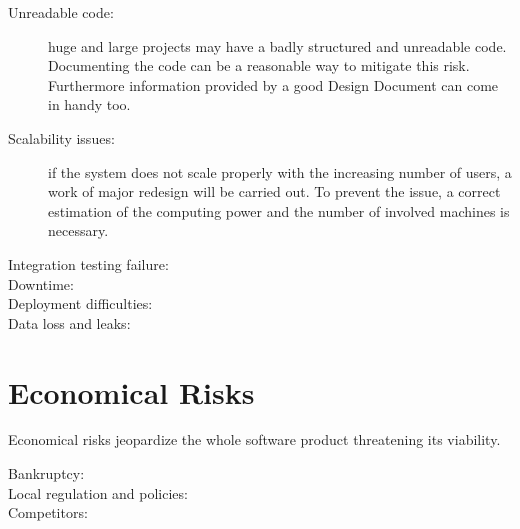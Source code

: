 \begin{description}
\item[Unreadable code:] huge and large projects may have a badly structured and unreadable code. Documenting the code can be a reasonable way to mitigate this risk. Furthermore information provided by a good Design Document can come in handy too.
\item[Scalability issues:] if the system does not scale properly with the increasing number of users, a work of major redesign will be carried out. To prevent the issue, a correct estimation of the computing power and the number of involved machines is necessary.
\item[Integration testing failure:]
\item[Downtime:]
\item[Deployment difficulties:]
\item[Data loss and leaks:]
\end{description}

\section{Economical Risks}
Economical risks jeopardize the whole software product threatening its viability.

\begin{description}
\item[Bankruptcy:]
\item[Local regulation and policies:]
\item[Competitors:]
\end{description}